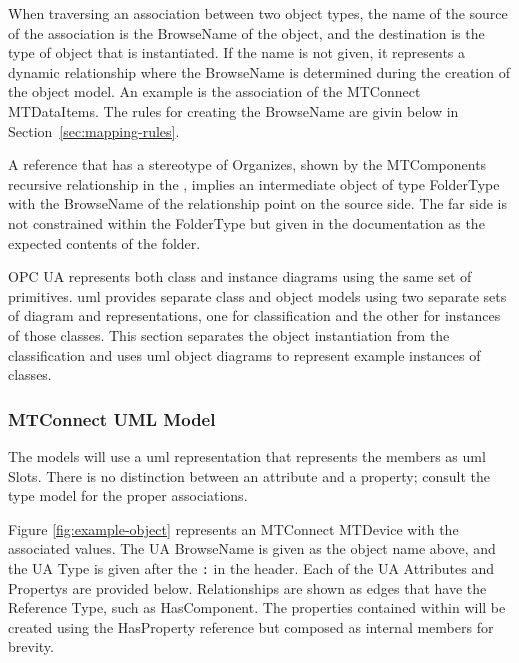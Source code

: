 When traversing an association between two object types, the name of the source of the association is the \gls{BrowseName} of the object, and the destination is the type of object that is instantiated. If the name is not given, it represents a dynamic relationship where the \gls{BrowseName} is determined during the creation of the object model. An example is the association of the MTConnect \glspl{MTDataItem}. The rules for creating the \gls{BrowseName} are givin below in Section~\ref{sec:mapping-rules}.

A reference that has a stereotype of \gls{Organizes}, shown by the \glspl{MTComponent} recursive relationship in the , implies an intermediate object of type \gls{FolderType} with the \gls{BrowseName} of the relationship point on the source side. The far side is not constrained within the \gls{FolderType} but given in the documentation as the expected contents of the folder.

OPC UA represents both class and instance diagrams using the same set of primitives. \gls{uml} provides separate class and object models using two separate sets of diagram and representations, one for classification and the other for instances of those classes. This section separates the object instantiation from the classification and uses \gls{uml} object diagrams to represent example instances of classes.

\FloatBarrier

\subsubsection{MTConnect UML Model}

The models will use a \gls{uml} representation that represents the members as \gls{uml} \glspl{Slot}. There is no distinction between an attribute and a property; consult the type model for the proper associations.



Figure \ref{fig:example-object} represents an MTConnect \gls{MTDevice} with the associated values. The UA \gls{BrowseName} is given as the object name above, and the UA Type is given after the \texttt{:} in the header. Each of the UA \glspl{Attribute} and \glspl{Property} are provided below. Relationships are shown as edges that have the Reference Type, such as \gls{HasComponent}. The properties contained within will be created using the \gls{HasProperty} reference but composed as internal members for brevity.

